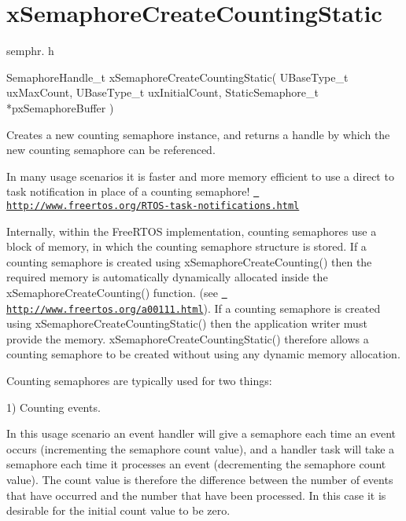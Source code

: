 \hypertarget{group__x_semaphore_create_counting_static}{}\section{x\+Semaphore\+Create\+Counting\+Static}
\label{group__x_semaphore_create_counting_static}
semphr. h 
\begin{DoxyPre}SemaphoreHandle\_t xSemaphoreCreateCountingStatic( UBaseType\_t uxMaxCount, UBaseType\_t uxInitialCount, StaticSemaphore\_t *pxSemaphoreBuffer )\end{DoxyPre}


Creates a new counting semaphore instance, and returns a handle by which the new counting semaphore can be referenced.

In many usage scenarios it is faster and more memory efficient to use a direct to task notification in place of a counting semaphore! \href{http://www.freertos.org/RTOS-task-notifications.html}{\texttt{ http\+://www.\+freertos.\+org/\+R\+T\+O\+S-\/task-\/notifications.\+html}}

Internally, within the Free\+R\+T\+OS implementation, counting semaphores use a block of memory, in which the counting semaphore structure is stored. If a counting semaphore is created using x\+Semaphore\+Create\+Counting() then the required memory is automatically dynamically allocated inside the x\+Semaphore\+Create\+Counting() function. (see \href{http://www.freertos.org/a00111.html}{\texttt{ http\+://www.\+freertos.\+org/a00111.\+html}}). If a counting semaphore is created using x\+Semaphore\+Create\+Counting\+Static() then the application writer must provide the memory. x\+Semaphore\+Create\+Counting\+Static() therefore allows a counting semaphore to be created without using any dynamic memory allocation.

Counting semaphores are typically used for two things\+:

1) Counting events.

In this usage scenario an event handler will \textquotesingle{}give\textquotesingle{} a semaphore each time an event occurs (incrementing the semaphore count value), and a handler task will \textquotesingle{}take\textquotesingle{} a semaphore each time it processes an event (decrementing the semaphore count value). The count value is therefore the difference between the number of events that have occurred and the number that have been processed. In this case it is desirable for the initial count value to be zero.

